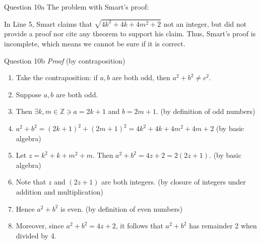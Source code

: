 \documentclass[10pt]{beamer}
\begin{document}
\begin{frame}[fragile]{Question 10a}
    The problem with Smart's proof: \par
    In Line 5, Smart claims that $\sqrt{4k^2 + 4k + 4m^2 + 2}$ not an integer, but did not provide a proof nor cite any theorem to support his claim. Thus, Smart’s proof is incomplete, which means we cannot be sure if it is correct.
\end{frame}

\begin{frame}[fragile]{Question 10b}
    \textit{Proof} (by contraposition)
\begin{enumerate}
    \item Take the contraposition: if $a, b$ are both odd, then $a^2 + b^2 \neq c^2$.
    \item Suppose $a, b$ are both odd.
    \item Then $\exists k, m \in \mathbb{Z} \ni a = 2k + 1$ and $b = 2m + 1$. (by definition of odd numbers)
    \item $a^2 + b^2 = (2k+ 1)^2 + (2m + 1)^2 = 4k^2 + 4k + 4m^2 + 4m + 2$ (by basic algebra)
    \item Let $z = k^2 + k + m^2 + m$. Then $a^2 + b^2 = 4z + 2 = 2(2z + 1)$. (by basic algebra)
    \item Note that $z$ and $(2z + 1)$ are both integers. (by closure of integers under addition and multiplication)
    \item Hence $a^2 + b^2$ is even. (by definition of even numbers)
    \item Moreover, since $a^2 + b^2 = 4z + 2$, it follows that $a^2 + b^2$ has remainder 2 when divided by 4.
\end{enumerate}
\end{frame}
\end{document}
